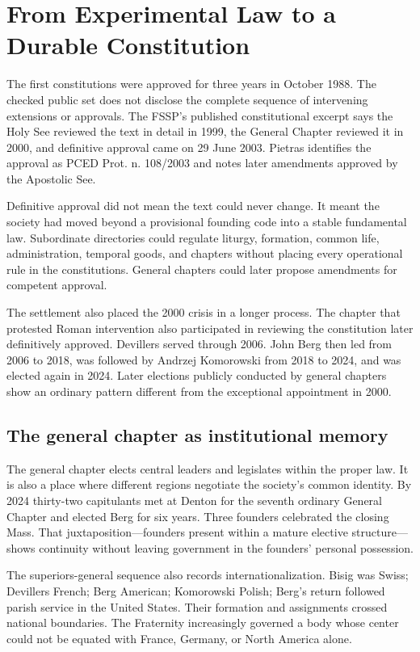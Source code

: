 \section{From Experimental Law to a Durable Constitution}

The first constitutions were approved for three years in October 1988. The checked public set does not disclose the complete sequence of intervening extensions or approvals. The FSSP's published constitutional excerpt says the Holy See reviewed the text in detail in 1999, the General Chapter reviewed it in 2000, and definitive approval came on 29 June 2003. Pietras identifies the approval as PCED Prot. n. 108/2003 and notes later amendments approved by the Apostolic See.

Definitive approval did not mean the text could never change. It meant the society had moved beyond a provisional founding code into a stable fundamental law. Subordinate directories could regulate liturgy, formation, common life, administration, temporal goods, and chapters without placing every operational rule in the constitutions. General chapters could later propose amendments for competent approval.

The settlement also placed the 2000 crisis in a longer process. The chapter that protested Roman intervention also participated in reviewing the constitution later definitively approved. Devillers served through 2006. John Berg then led from 2006 to 2018, was followed by Andrzej Komorowski from 2018 to 2024, and was elected again in 2024. Later elections publicly conducted by general chapters show an ordinary pattern different from the exceptional appointment in 2000.

\subsection{The general chapter as institutional memory}

The general chapter elects central leaders and legislates within the proper law. It is also a place where different regions negotiate the society's common identity. By 2024 thirty-two capitulants met at Denton for the seventh ordinary General Chapter and elected Berg for six years. Three founders celebrated the closing Mass. That juxtaposition---founders present within a mature elective structure---shows continuity without leaving government in the founders' personal possession.

The superiors-general sequence also records internationalization. Bisig was Swiss; Devillers French; Berg American; Komorowski Polish; Berg's return followed parish service in the United States. Their formation and assignments crossed national boundaries. The Fraternity increasingly governed a body whose center could not be equated with France, Germany, or North America alone.

